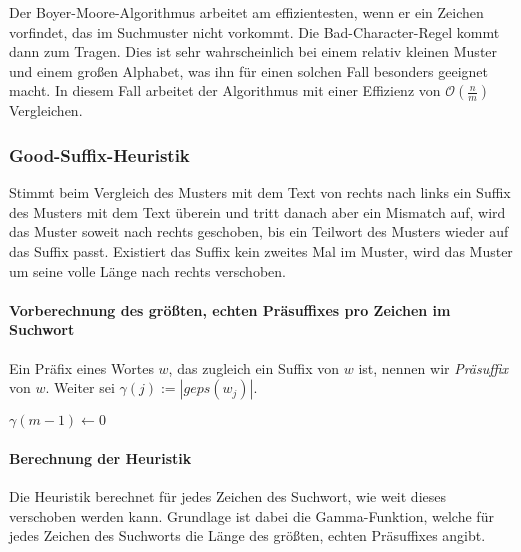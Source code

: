 Der Boyer-Moore-Algorithmus arbeitet am effizientesten, wenn er ein Zeichen vorfindet, das im Suchmuster nicht vorkommt. Die Bad-Character-Regel kommt dann zum Tragen. Dies ist sehr wahrscheinlich bei einem relativ kleinen Muster und einem großen Alphabet, was ihn für einen solchen Fall besonders geeignet macht. In diesem Fall arbeitet der Algorithmus mit einer Effizienz von \(\mathcal{O}(\frac{n}{m})\) Vergleichen.

\subsubsection{Good-Suffix-Heuristik}
Stimmt beim Vergleich des Musters mit dem Text von rechts nach links ein Suffix des Musters mit dem Text überein und tritt danach aber ein Mismatch auf, wird das Muster soweit nach rechts geschoben, bis ein Teilwort des Musters wieder auf das Suffix passt. Existiert das Suffix kein zweites Mal im Muster, wird das Muster um seine volle Länge nach rechts verschoben.

\paragraph{Vorberechnung des größten, echten Präsuffixes pro Zeichen im Suchwort}
Ein Präfix eines Wortes \(w\), das zugleich ein Suffix von \(w\) ist, nennen wir \textit{Präsuffix} von \(w\). Weiter sei \(\gamma(j) := | geps(w_j)|\).

\begin{algorithm}[H]
	\caption{$\gamma$}

	\BlankLine

	$\gamma(m-1) \longleftarrow 0$\newline
	\BlankLine

\end{algorithm}

\paragraph{Berechnung der Heuristik}
Die Heuristik berechnet für jedes Zeichen des Suchwort, wie weit dieses verschoben werden kann. Grundlage ist dabei die Gamma-Funktion, welche für jedes Zeichen des Suchworts die Länge des größten, echten Präsuffixes angibt.

